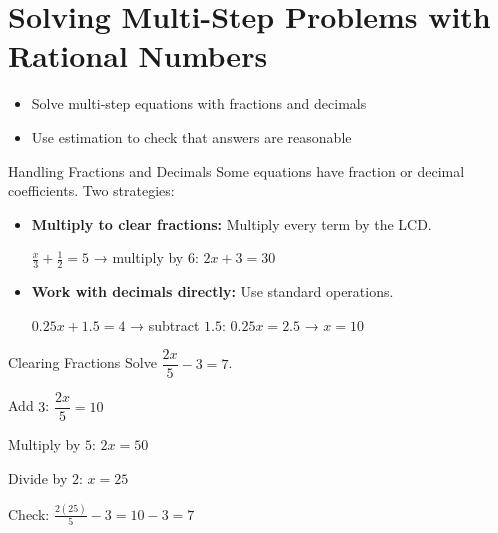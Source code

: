 \section{Solving Multi-Step Problems with Rational Numbers}

\begin{learningGoals}
\begin{itemize}
    \item Solve multi-step equations with fractions and decimals
    \item Use estimation to check that answers are reasonable
\end{itemize}
\end{learningGoals}

\begin{conceptBox}{Handling Fractions and Decimals}
Some equations have fraction or decimal coefficients. Two strategies:
\begin{itemize}[leftmargin=*]
    \item \textbf{Multiply to clear fractions:} Multiply every term by the LCD.
    
    $\frac{x}{3} + \frac{1}{2} = 5$ → multiply by $6$: $2x + 3 = 30$
    \item \textbf{Work with decimals directly:} Use standard operations.
    
    $0.25x + 1.5 = 4$ → subtract $1.5$: $0.25x = 2.5$ → $x = 10$
\end{itemize}
\end{conceptBox}

\begin{workedExample}{Clearing Fractions}
Solve $\dfrac{2x}{5} - 3 = 7$.

Add $3$: $\dfrac{2x}{5} = 10$

Multiply by $5$: $2x = 50$

Divide by $2$: $x = 25$

Check: $\frac{2(25)}{5} - 3 = 10 - 3 = 7$ \checkmark
{}
\end{workedExample}



